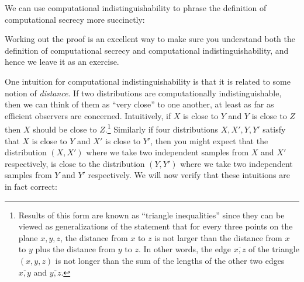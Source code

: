 We can use computational indistinguishability to phrase the definition
of computational secrecy more succinctly:

\hypertarget{compindsecthm}{}

Working out the proof is an excellent way to make sure you understand
both the definition of computational secrecy and computational
indistinguishability, and hence we leave it as an exercise.

One intuition for computational indistinguishability is that it is
related to some notion of \emph{distance}. If two distributions are
computationally indistinguishable, then we can think of them as ``very
close'' to one another, at least as far as efficient observers are
concerned. Intuitively, if \(X\) is close to \(Y\) and \(Y\) is close to
\(Z\) then \(X\) should be close to \(Z\).\footnote{Results of this form
  are known as ``triangle inequalities'' since they can be viewed as
  generalizations of the statement that for every three points on the
  plane \(x,y,z\), the distance from \(x\) to \(z\) is not larger than
  the distance from \(x\) to \(y\) plus the distance from \(y\) to
  \(z\). In other words, the edge \(\overline{x,z}\) of the triangle
  \((x,y,z)\) is not longer than the sum of the lengths of the other two
  edges \(\overline{x,y}\) and \(\overline{y,z}\).} Similarly if four
distributions \(X,X',Y,Y'\) satisfy that \(X\) is close to \(Y\) and
\(X'\) is close to \(Y'\), then you might expect that the distribution
\((X,X')\) where we take two independent samples from \(X\) and \(X'\)
respectively, is close to the distribution \((Y,Y')\) where we take two
independent samples from \(Y\) and \(Y'\) respectively. We will now
verify that these intuitions are in fact correct:

\hypertarget{triangleeqthm}{}

